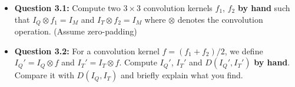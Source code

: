 \begin{itemize}
\item \textbf{Question 3.1:} Compute two $3 \times 3$ convolution kernels $f_1$, $f_2$ \textbf{by hand} such that $I_Q \otimes f_1 = I_M$ and $I_T \otimes f_2 = I_M$ where $\otimes$ denotes the convolution operation. (Assume zero-padding)

\item \textbf{Question 3.2:} For a convolution kernel $f=(f_1 + f_2) / 2$, we define $I_{Q}' = I_{Q} \otimes f$ and $I_{T}' = I_{T} \otimes f$. Compute $I_{Q}'$, $I_{T}'$ and $D(I_{Q}', I_{T}')$ \textbf{by hand}. Compare it with $D(I_{Q}, I_{T})$ and briefly explain what you find. 
\end{itemize}